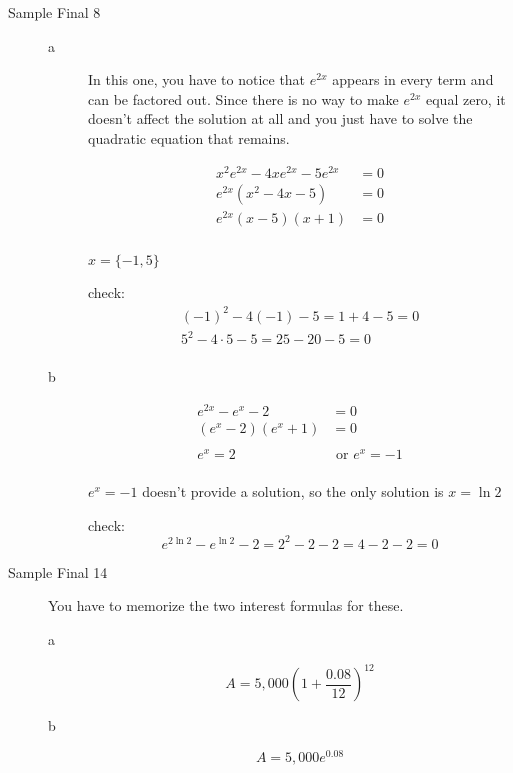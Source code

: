 \documentclass[fleqn,addpoints]{exam}
\begin{document}
\begin{description}
\item[Sample Final 8]
\begin{description}
\item[a]
In this one, you have to notice that $e^{2x}$ appears in every term and can be factored out.  Since there is no way to
make $e^{2x}$ equal zero, it doesn't affect the solution at all and you just have to solve the quadratic equation that
remains.

\begin{align*}
  x^2e^{2x} - 4xe^{2x} - 5e^{2x} &= 0 \\
  e^{2x} ( x^2 - 4x - 5) &= 0 \\
  e^{2x} (x-5)(x+1) &= 0 \\
\end{align*}

$x = \{-1, 5 \}$

check:
\begin{align*}
  (-1)^2 - 4(-1) - 5 = 1 + 4 - 5 = 0 \\
  5^2 - 4 \cdot 5 - 5 = 25 - 20 - 5 = 0 \\
\end{align*}

\item[b]
\begin{align*}
  e^{2x} - e^x - 2 &= 0 \\
  (e^x - 2)(e^x + 1) &= 0 \\
  \\
  e^x = 2 & \text{ or } e^x = -1 \\
\end{align*}

$e^x = -1$ doesn't provide a solution, so the only solution is $x = \ln 2$

check:
\[
  e^{2 \ln 2} - e^{\ln 2} - 2 = 2^2 - 2 - 2 = 4 - 2 - 2 = 0
\]

\end{description}

\item[Sample Final 14]
You have to memorize the two interest formulas for these.

\begin{description}

\item[a]
\[
  A = 5,000 \left(1 + \frac{0.08}{12} \right)^{12}
\]

\item[b]
\[
  A = 5,000 e^{0.08}
\]

\end{description}

\end{description}
\end{document}
